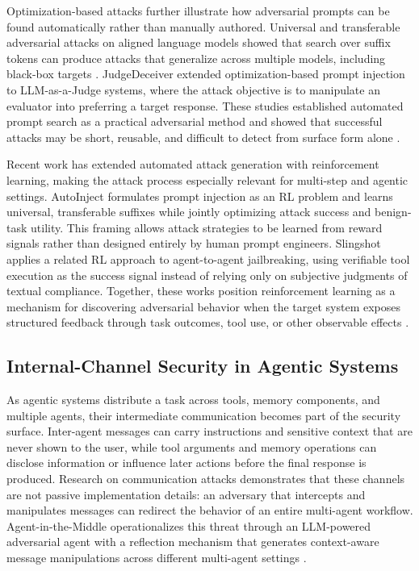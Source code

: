 Optimization-based attacks further illustrate how adversarial prompts can be
found automatically rather than manually authored. Universal and transferable
adversarial attacks on aligned language models showed that search over suffix
tokens can produce attacks that generalize across multiple models, including
black-box targets \cite{zou2023universal}. JudgeDeceiver \cite{shi2024judgedeceiver} extended
optimization-based prompt injection to LLM-as-a-Judge systems, where the attack
objective is to manipulate an evaluator into preferring a target response. 
These studies established automated prompt search
as a practical adversarial method and showed that successful attacks may be
short, reusable, and difficult to detect from surface form alone
\cite{zou2023universal,shi2024judgedeceiver}.

Recent work has extended automated attack generation with reinforcement
learning, making the attack process especially relevant for multi-step and
agentic settings. AutoInject \cite{learningtoinject2026} formulates prompt
injection as an RL problem and learns universal, transferable suffixes while
jointly optimizing attack success and benign-task utility. This framing allows
attack strategies to be learned from reward signals rather than designed
entirely by human prompt engineers. Slingshot \cite{verifiableagenttoagent2026}
applies a related RL approach to agent-to-agent jailbreaking, using verifiable
tool execution as the success signal instead of relying only on subjective
judgments of textual compliance. Together, these works position reinforcement
learning as a mechanism for discovering adversarial behavior when the target
system exposes structured feedback through task outcomes, tool use, or other
observable effects \cite{learningtoinject2026,verifiableagenttoagent2026}.

\subsection{Internal-Channel Security in Agentic Systems}
As agentic systems distribute a task across tools, memory components, and
multiple agents, their intermediate communication becomes part of the security
surface. Inter-agent messages can carry instructions and sensitive context
that are never shown to the user, while tool arguments and memory operations
can disclose information or influence later actions before the final response
is produced. Research on communication attacks demonstrates that these
channels are not passive implementation details: an adversary that intercepts
and manipulates messages can redirect the behavior of an entire multi-agent
workflow. Agent-in-the-Middle operationalizes this threat through an
LLM-powered adversarial agent with a reflection mechanism that generates
context-aware message manipulations across different multi-agent settings
\cite{he2025communication}.


